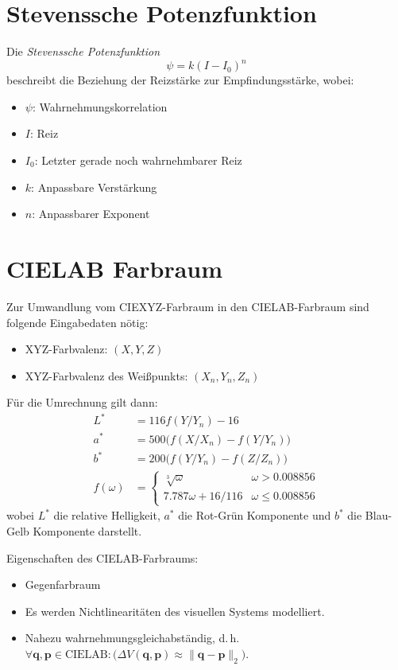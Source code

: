 \documentclass[a4paper, 11pt, accentcolor = tud3b]{tudreport}
\renewcommand{\vec}[1]{\boldsymbol{\mathbf{#1}}}
\renewcommand{\dh}{d.\,h.~}
\begin{document}
		\section{Stevenssche Potenzfunktion}
			Die \emph{Stevenssche Potenzfunktion}
			\begin{equation*}
				\psi = k(I - I_0)^n
			\end{equation*}
			beschreibt die Beziehung der Reizstärke zur Empfindungsstärke, wobei:
			\begin{itemize}
				\item \(\psi\): Wahrnehmungskorrelation
				\item \(I\): Reiz
				\item \(I_0\): Letzter gerade noch wahrnehmbarer Reiz
				\item \(k\): Anpassbare Verstärkung
				\item \(n\): Anpassbarer Exponent
			\end{itemize}

		\section{CIELAB Farbraum}
			Zur Umwandlung vom CIEXYZ-Farbraum in den CIELAB-Farbraum sind folgende Eingabedaten nötig:
			\begin{itemize}
				\item XYZ-Farbvalenz: \( (X, Y, Z) \)
				\item XYZ-Farbvalenz des Weißpunkts: \( (X_n, Y_n, Z_n) \)
			\end{itemize}
			Für die Umrechnung gilt dann:
			\begin{align*}
				L^\ast &= 116 f(Y / Y_n) - 16 \\
				a^\ast &= 500 \big( f(X / X_n) - f(Y / Y_n) \big) \\
				b^\ast &= 200 \big( f(Y / Y_n) - f(Z / Z_n) \big) \\
				f(\omega) &=
					\begin{cases}
						\sqrt[3]{\omega}     & \omega > 0.008856    \\
						7.787\omega + 16/116 & \omega \leq 0.008856
					\end{cases}
			\end{align*}
			wobei \( L^\ast \) die relative Helligkeit, \( a^\ast \) die Rot-Grün Komponente und \( b^\ast \) die Blau-Gelb Komponente darstellt.
			
			Eigenschaften des CIELAB-Farbraums:
			\begin{itemize}
				\item Gegenfarbraum
				\item Es werden Nichtlinearitäten des visuellen Systems modelliert.
				\item Nahezu wahrnehmungsgleichabständig, \dh \( \forall \vec{q}, \vec{p} \in \text{CIELAB} : \big( \Delta V (\vec{q}, \vec{p}) \approx \rVert \vec{q} - \vec{p} \lVert_2 \big) \).
			\end{itemize}
		
\end{document}
